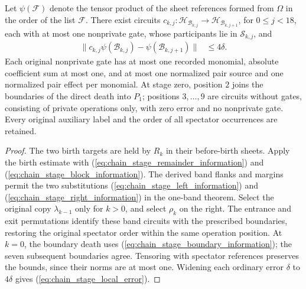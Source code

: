 \begin{lemma}
    Let $\psi(\mathcal F)$ denote the tensor product of the sheet references
    formed from $\Omega$ in the order of the list $\mathcal F$.
    There exist circuits
    $c_{k,j}:\mathcal H_{\mathcal B_{k,j}}\to
        \mathcal H_{\mathcal B_{k,j+1}}$, for $0\le j<18$, each with at most
    one nonprivate gate, whose participants lie in $\mathcal S_{k,j}$, and
    \begin{align}
        \|c_{k,j}\psi(\mathcal B_{k,j})-
        \psi(\mathcal B_{k,j+1})\| & \le4\delta.
        \label{eq:chain_stage_local_error}
    \end{align}
    Each original nonprivate gate has at most one recorded monomial,
    absolute coefficient sum at most one, and at most one normalized
    pair source and one normalized pair effect per monomial.
    At stage zero, position $2$ joins the boundaries of the direct
    death into $P_1$; positions $3,\ldots,9$ are circuits without gates,
    consisting of private operations only, with zero error and no
    nonprivate gate. Every original auxiliary label and the order
    of all spectator occurrences are retained.
\end{lemma}
\begin{proof}\leanok
    The two birth targets are held by $R_k$ in their before-birth
    sheets. Apply the birth estimate with
    (\ref{eq:chain_stage_remainder_information}) and
    (\ref{eq:chain_stage_block_information}). The derived band flanks and
    margins permit the two substitutions
    (\ref{eq:chain_stage_left_information}) and
    (\ref{eq:chain_stage_right_information}) in the one-band theorem.
    Select the original copy $\lambda_{k-1}$ only for $k>0$, and select
    $\rho_k$ on the right. The entrance and exit permutations identify
    these band circuits with the prescribed boundaries, restoring the
    original spectator order within the same operation position.
    At $k=0$, the boundary death uses
    (\ref{eq:chain_stage_boundary_information}); the seven subsequent
    boundaries agree. Tensoring with spectator references preserves the
    bounds, since their norms are at most one. Widening each ordinary
    error $\delta$ to $4\delta$ gives (\ref{eq:chain_stage_local_error}).
\end{proof}

